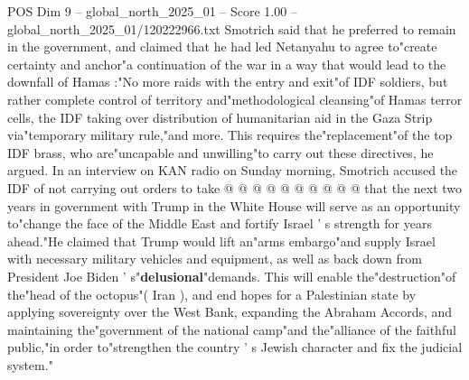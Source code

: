 \begin{textsample}{POS Dim 9 – global\_north\_2025\_01 – Score 1.00 – global\_north\_2025\_01/120222966.txt}
Smotrich said that he preferred to remain in the government, and claimed that he had led Netanyahu to agree to"create certainty and anchor"a continuation of the war in a way that would lead to the downfall of Hamas :"No more raids with the entry and exit"of IDF soldiers, but rather complete control of territory and"methodological cleansing"of Hamas terror cells, the IDF taking over distribution of humanitarian aid in the Gaza Strip via"temporary military rule,"and more.
This requires the"replacement"of the top IDF brass, who are"uncapable and unwilling"to carry out these directives, he argued.
In an interview on KAN radio on Sunday morning, Smotrich accused the IDF of not carrying out orders to take @ @ @ @ @ @ @ @ @ @ that the next two years in government with Trump in the White House will serve as an opportunity to"change the face of the Middle East and fortify Israel ' s strength for years ahead."He claimed that Trump would lift an"arms embargo"and supply Israel with necessary military vehicles and equipment, as well as back down from President Joe Biden ' s"\textbf{delusional}"demands.
This will enable the"destruction"of the"head of the octopus"( Iran ), and end hopes for a Palestinian state by applying sovereignty over the West Bank, expanding the Abraham Accords, and maintaining the"government of the national camp"and the"alliance of the faithful public,"in order to"strengthen the country ' s Jewish character and fix the judicial system."

\end{textsample}
